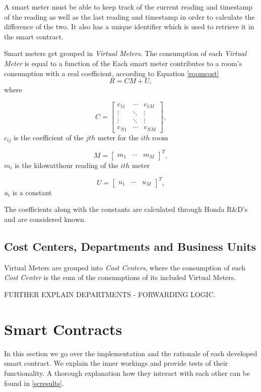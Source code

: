 A smart meter must be able to keep track of the current reading and timestamp of the reading as well as the last reading and timestamp in order to calculate the difference of the two. It also has a unique identifier which is used to retrieve it in the smart contract.

Smart meters get grouped in \textit{Virtual Meters}. The consumption of each \textit{Virtual Meter} is equal to a function of the Each smart meter contributes to a room's consumption with a real coefficient, according to Equation \ref{roomcost}
\begin{equation}\label{roomcost}
R = CM + U,
\end{equation}
\noindent where
\begin{description}
\item  \[C = 
\begin{bmatrix}
    c_{11} & \cdots & c_{1M} \\
    \vdots & \ddots & \vdots \\ 
    \vdots & \ddots & \vdots \\
    c_{N1} & \cdots & c_{NM}
  \end{bmatrix},\]
\noindent $c_{ij}$ is the coefficient of the $jth$ meter for the $ith$ room
\item  \[M = 
\begin{bmatrix}
    m_{1} & \cdots & m_{M}
\end{bmatrix}^T,\]
\noindent $m_{i}$ is the kilowatthour reading of the $ith$ meter
\item  \[U=
\begin{bmatrix}
    u_{1} & \cdots & u_{M}
\end{bmatrix}^T,\]
\noindent $u_{i}$ is a constant
\end{description}

The coefficients along with the constants are calculated through Honda R\&D's and are considered known. 

\subsection{Cost Centers, Departments and Business Units}
Virtual Meters are grouped into \textit{Cost Centers}, where the consumption of each \textit{Cost Center} is the sum of the consumptions of its included Virtual Meters.

FURTHER EXPLAIN DEPARTMENTS - FORWARDING LOGIC.

\section{Smart Contracts} \label{ch:implementation:sc}
In this section we go over the implementation and the rationale of each developed smart contract. We explain the inner workings and provide tests of their functionality. A thorough explanation how they interact with each other can be found in \ref{scresults}.

